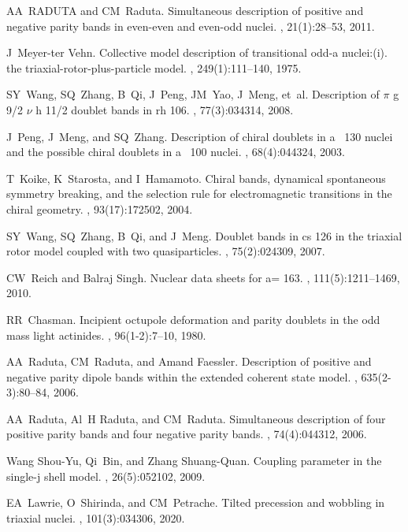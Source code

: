 \documentclass[11pt]{article}
\begin{document}
\begin{thebibliography}{99}
AA~RADUTA and CM~Raduta.
\newblock Simultaneous description of positive and negative parity bands in
  even-even and even-odd nuclei.
, 21(1):28--53,
  2011.

J~Meyer-ter Vehn.
\newblock Collective model description of transitional odd-a nuclei:(i). the
  triaxial-rotor-plus-particle model.
, 249(1):111--140, 1975.

SY~Wang, SQ~Zhang, B~Qi, J~Peng, JM~Yao, J~Meng, et~al.
\newblock Description of $\pi$ g 9/2 $\nu$ h 11/2 doublet bands in rh 106.
, 77(3):034314, 2008.

J~Peng, J~Meng, and SQ~Zhang.
\newblock Description of chiral doublets in a~ 130 nuclei and the possible
  chiral doublets in a~ 100 nuclei.
, 68(4):044324, 2003.

T~Koike, K~Starosta, and I~Hamamoto.
\newblock Chiral bands, dynamical spontaneous symmetry breaking, and the
  selection rule for electromagnetic transitions in the chiral geometry.
, 93(17):172502, 2004.

SY~Wang, SQ~Zhang, B~Qi, and J~Meng.
\newblock Doublet bands in cs 126 in the triaxial rotor model coupled with two
  quasiparticles.
, 75(2):024309, 2007.

CW~Reich and Balraj Singh.
\newblock Nuclear data sheets for a= 163.
, 111(5):1211--1469, 2010.

RR~Chasman.
\newblock Incipient octupole deformation and parity doublets in the odd mass
  light actinides.
, 96(1-2):7--10, 1980.

AA~Raduta, CM~Raduta, and Amand Faessler.
\newblock Description of positive and negative parity dipole bands within the
  extended coherent state model.
, 635(2-3):80--84, 2006.

AA~Raduta, Al~H Raduta, and CM~Raduta.
\newblock Simultaneous description of four positive parity bands and four
  negative parity bands.
, 74(4):044312, 2006.

Wang Shou-Yu, Qi~Bin, and Zhang Shuang-Quan.
\newblock Coupling parameter in the single-j shell model.
, 26(5):052102, 2009.

EA~Lawrie, O~Shirinda, and CM~Petrache.
\newblock Tilted precession and wobbling in triaxial nuclei.
, 101(3):034306, 2020.

\end{thebibliography}
\end{document}
